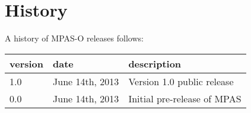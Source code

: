 \chapter*{History}
\label{chap:history}

A history of MPAS-O releases follows: \\


\begin{tabular}{lll} 
\hline\hline version & date & description  \\
\hline 
1.0 & June 14th, 2013 & Version 1.0 public release \\
\hline 
0.0 & June 14th, 2013 & Initial pre-release of MPAS \\
\hline 
\end{tabular} 


\newpage
